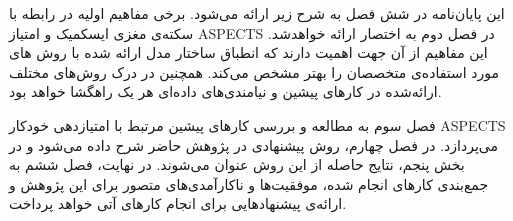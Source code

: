 این پایان‌نامه در شش فصل به شرح زیر ارائه می‌شود.
برخی مفاهیم اولیه در رابطه با سکته‌ی مغزی ایسکمیک و امتیاز ASPECTS در فصل دوم به اختصار ارائه خواهد‌شد.
این مفاهیم از آن جهت اهمیت دارند که انطباق ساختار مدل ارائه شده با روش های مورد استفاده‌ی متخصصان را بهتر مشخص می‌کند.
همچنین در درک روش‌های مختلف ارائه‌شده در کارهای پیشین و نیامندی‌های داده‌ای هر یک راهگشا خواهد بود.

فصل سوم به مطالعه و بررسی کارهای پیشین مرتبط با امتیاز‌دهی خودکار ASPECTS می‌پردازد.
در فصل چهارم، روش پیشنهادی در پژوهش حاضر شرح داده می‌شود 
و در بخش پنجم، نتایج حاصله از این روش عنوان می‌شوند.
در نهایت،‌ فصل ششم به جمع‌بندی کارهای انجام شده، موفقیت‌ها و ناکارآمدی‌های متصور برای این پژوهش و ارائه‌ی پیشنهادهایی برای انجام کارهای آتی خواهد پرداخت.